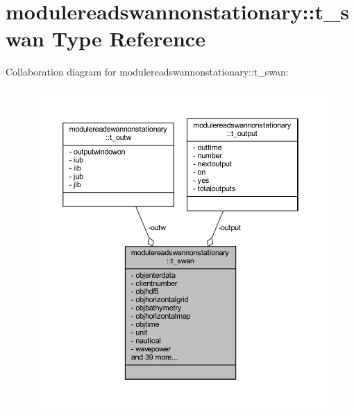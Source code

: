 \hypertarget{structmodulereadswannonstationary_1_1t__swan}{}\section{modulereadswannonstationary\+:\+:t\+\_\+swan Type Reference}
\label{structmodulereadswannonstationary_1_1t__swan}


Collaboration diagram for modulereadswannonstationary\+:\+:t\+\_\+swan\+:\nopagebreak
\begin{figure}[H]
\begin{center}
\leavevmode
\includegraphics[width=350pt]{structmodulereadswannonstationary_1_1t__swan__coll__graph}
\end{center}
\end{figure}
